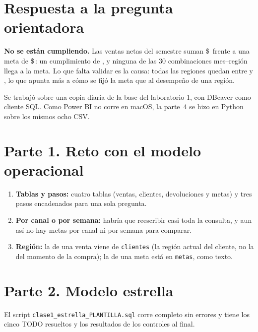 \documentclass[11pt,letterpaper]{article}
\newcommand{\cop}[1]{\$\,#1}
\newcommand{\destacar}[1]{{\color{udrojoosc}\bfseries #1}}
\begin{document}
\UDportada
\tableofcontents
\newpage

\section{Respuesta a la pregunta orientadora}

\textbf{No se están cumpliendo.} Las ventas netas del semestre suman \cop{\VentasNetasTotal} frente a una meta de
\cop{\MetaTotal}: un cumplimiento de \destacar{\CumplTotal}, y ninguna de las 30 combinaciones mes--región llega a la
meta. Lo que falta validar es la causa: todas las regiones quedan entre \CumplRegMin{} y \CumplRegMax, lo que apunta
más a cómo se fijó la meta que al desempeño de una región.

\medskip
Se trabajó sobre una copia diaria de la base del laboratorio 1, con DBeaver como cliente SQL. Como Power BI no
corre en macOS, la parte~4 se hizo en Python sobre los mismos ocho CSV.

\section{Parte 1. Reto con el modelo operacional}

\begin{enumerate}
  \item \textbf{Tablas y pasos:} cuatro tablas (ventas, clientes, devoluciones y metas) y tres pasos encadenados
        para una sola pregunta.
  \item \textbf{Por canal o por semana:} habría que reescribir casi toda la consulta, y aun así no hay metas por
        canal ni por semana para comparar.
  \item \textbf{Región:} la de una venta viene de \texttt{clientes} (la región actual del cliente, no la del momento
        de la compra); la de una meta está en \texttt{metas}, como texto.
\end{enumerate}

\section{Parte 2. Modelo estrella}

El script \texttt{clase1\_estrella\_PLANTILLA.sql} corre completo sin errores y tiene los cinco TODO
resueltos y los resultados de los controles al final.
\end{document}
